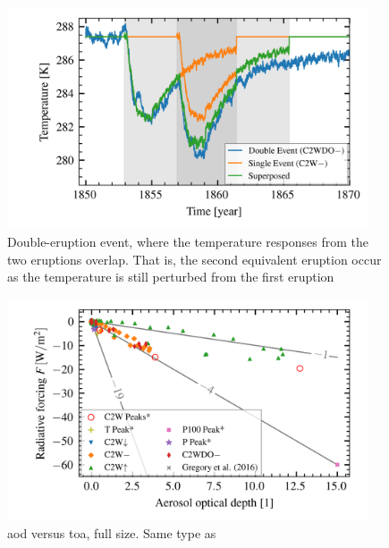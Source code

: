 \documentclass{ametsocV5}
\begin{document}
\begin{figure}
  \begin{center}
    \includegraphics[width=0.95\textwidth]{figures/double-overlap-superpose.png}
  \end{center}
  \caption{Double-eruption event, where the temperature responses from the two
    eruptions overlap. That is, the second equivalent eruption occur as the temperature
    is still perturbed from the first eruption}
  \label{fig:double-overlap-superpose}
\end{figure}

\begin{figure}
  \begin{center}
    \includegraphics[width=0.95\textwidth]{figures/aod_vs_toa_avg_full.png}
  \end{center}
  \caption{\acrshort{aod} versus \acrshort{toa}, full size. Same type as \cite{gregory2016}}
  \label{fig:aod_vs_toa_full}
\end{figure}
\end{document}
